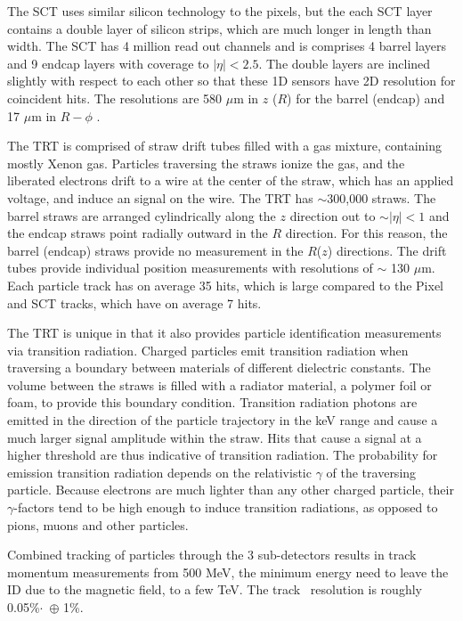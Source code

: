The SCT uses similar silicon technology to the pixels, but the each SCT layer contains a double layer of silicon strips, which are much longer in length than width. The SCT has 4 million read out channels and is comprises 4 barrel layers and 9 endcap layers with coverage to $|\eta| < 2.5$. The double layers are inclined slightly with respect to each other so that these 1D sensors have 2D resolution for coincident hits. The resolutions are 580 $\mu$m in $z$ ($R$) for the barrel (endcap) and 17 $\mu$m in $R-\phi$ .

The TRT is comprised of straw drift tubes filled with a gas mixture, containing mostly Xenon gas. Particles traversing the straws ionize the gas, and the liberated electrons drift to a wire at the center of the straw, which has an applied voltage, and induce an signal on the wire. The TRT has $\sim$300,000 straws. The barrel straws are arranged cylindrically along the $z$ direction out to $\sim|\eta| < 1$ and the endcap straws point radially outward in the $R$ direction. For this reason, the barrel (endcap) straws provide no measurement in the $R$($z$) directions. The drift tubes provide individual position measurements with resolutions of $\sim$ 130 $\mu$m. Each particle track has on average 35 hits, which is large compared to the Pixel and SCT tracks, which have on average 7 hits. 

The TRT is unique in that it also provides particle identification measurements via transition radiation. Charged particles emit transition radiation when traversing a boundary between materials of different dielectric constants. The volume between the straws is filled with a radiator material, a polymer foil or foam, to provide this boundary condition. Transition radiation photons are emitted in the direction of the particle trajectory in the keV range and cause a much larger signal amplitude within the straw. Hits that cause a signal at a higher threshold are thus indicative of transition radiation.  The probability for emission transition radiation depends on the relativistic $\gamma$ of the traversing particle. Because electrons are much lighter than any other charged particle, their $\gamma$-factors tend to be high enough to induce transition radiations, as opposed to pions, muons and other particles. 

Combined tracking of particles through the 3 sub-detectors results in track momentum measurements from 500 MeV, the minimum energy need to leave the ID due to the magnetic field, to a few TeV. The track \pt\ resolution is roughly 0.05\%$\cdot$\pt\ $\oplus$ 1\%.  

